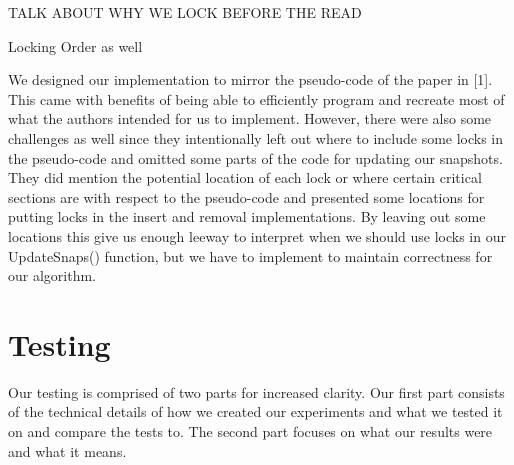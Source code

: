 \documentclass[conference]{IEEEtran}
\begin{document}
TALK ABOUT WHY WE LOCK BEFORE THE READ

Locking Order as well

We designed our implementation to mirror the pseudo-code of the paper in [1]. This came with benefits of being able to efficiently program and recreate most of what the authors intended for us to implement. However, there were also some challenges as well since they intentionally left out where to include some locks in the pseudo-code and omitted some parts of the code for updating our snapshots. They did mention the potential location of each lock or where certain critical sections are with respect to the pseudo-code and presented some locations for putting locks in the insert and removal implementations. By leaving out some locations this give us enough leeway to interpret when we should use locks in our UpdateSnaps() function, but we have to implement to maintain correctness for our algorithm.

\section{Testing}

Our testing is comprised of two parts for increased clarity. Our first part consists of the technical details of how we created our experiments and what we tested it on and compare the tests to. The second part focuses on what our results were and what it means.
\end{document}
